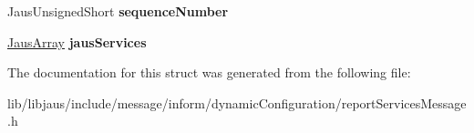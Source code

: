 \begin{DoxyCompactItemize}
\item 
\hypertarget{struct_report_services_message_struct_ad0a5c3ffe1dbc4c014424a0953d0f368}{\-Jaus\-Unsigned\-Short {\bfseries sequence\-Number}}\label{struct_report_services_message_struct_ad0a5c3ffe1dbc4c014424a0953d0f368}

\item 
\hypertarget{struct_report_services_message_struct_a338e428a21c3f6df061ec78e4dd254f8}{\hyperlink{struct_jaus_array_struct}{\-Jaus\-Array} {\bfseries jaus\-Services}}\label{struct_report_services_message_struct_a338e428a21c3f6df061ec78e4dd254f8}

\end{DoxyCompactItemize}


\-The documentation for this struct was generated from the following file\-:\begin{DoxyCompactItemize}
\item 
lib/libjaus/include/message/inform/dynamic\-Configuration/report\-Services\-Message.\-h\end{DoxyCompactItemize}
